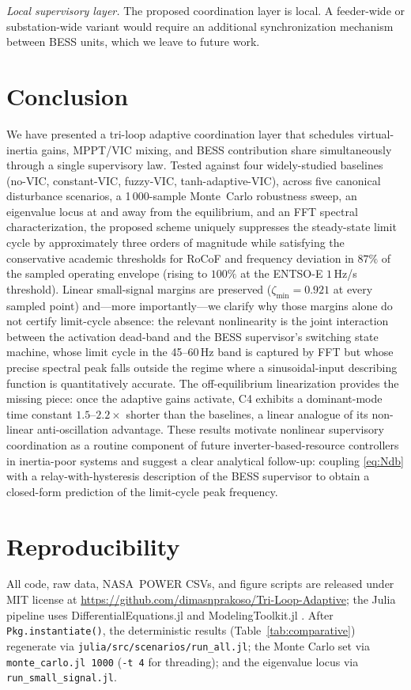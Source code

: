 \documentclass[journal]{IEEEtran}
\begin{document}
\textit{Local supervisory layer.} The proposed coordination layer is
local. A feeder-wide or substation-wide variant
\cite{trovato2024nadir,zhao2023inertia} would require an additional
synchronization mechanism between BESS units, which we leave to
future work.

\section{Conclusion}\label{sec:conclusion}
We have presented a tri-loop adaptive coordination layer that
schedules virtual-inertia gains, MPPT/VIC mixing, and BESS
contribution share simultaneously through a single supervisory law.
Tested against four widely-studied baselines (no-VIC, constant-VIC,
fuzzy-VIC, tanh-adaptive-VIC), across five canonical disturbance
scenarios, a 1\,000-sample Monte~Carlo robustness sweep, an
eigenvalue locus at and away from the equilibrium, and an FFT
spectral characterization, the proposed scheme uniquely suppresses
the steady-state limit cycle by approximately three orders of
magnitude while satisfying the conservative academic thresholds for
RoCoF and frequency deviation in $87\%$ of the sampled operating
envelope (rising to $100\%$ at the ENTSO-E $1$\,Hz/s threshold).
Linear small-signal margins are preserved
($\zeta_\mathrm{min}=0.921$ at every sampled point) and---more
importantly---we clarify why those margins alone do not certify
limit-cycle absence: the relevant nonlinearity is the joint
interaction between the activation dead-band and the BESS
supervisor's switching state machine, whose limit cycle in the
45--60\,Hz band is captured by FFT but whose precise spectral peak
falls outside the regime where a sinusoidal-input describing function
is quantitatively accurate. The off-equilibrium linearization
provides the missing piece: once the adaptive gains activate, C4
exhibits a dominant-mode time constant $1.5$--$2.2\times$ shorter
than the baselines, a linear analogue of its non-linear
anti-oscillation advantage. These results motivate nonlinear
supervisory coordination as a routine component of future
inverter-based-resource controllers in inertia-poor systems and
suggest a clear analytical follow-up: coupling \eqref{eq:Ndb} with
a relay-with-hysteresis description of the BESS supervisor to obtain
a closed-form prediction of the limit-cycle peak frequency.

\section*{Reproducibility}
All code, raw data, NASA~POWER CSVs, and figure scripts are released
under MIT license at
\url{https://github.com/dimasnprakoso/Tri-Loop-Adaptive}; the Julia
pipeline uses DifferentialEquations.jl \cite{rackauckas2017diffeq}
and ModelingToolkit.jl \cite{ma2021modelingtoolkit}. After
\texttt{Pkg.instantiate()}, the deterministic results
(Table~\ref{tab:comparative}) regenerate via
\texttt{julia/src/scenarios/run\_all.jl}; the Monte Carlo set via
\texttt{monte\_carlo.jl 1000} (\texttt{-t 4} for threading); and the
eigenvalue locus via \texttt{run\_small\_signal.jl}.
\end{document}
